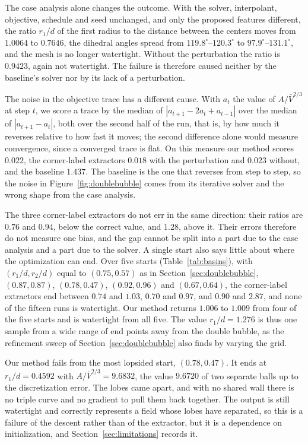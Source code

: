 \documentclass[11pt]{article}
\theoremstyle{definition}
\begin{document}
The case analysis alone changes the outcome. With the solver, interpolant,
objective, schedule and seed unchanged, and only the proposed features
different, the ratio $r_1/d$ of the first radius to the distance between the
centers moves from $1.0064$ to $0.7646$, the dihedral angles
spread from $119.8^\circ$--$120.3^\circ$ to $97.9^\circ$--$131.1^\circ$, and
the mesh is no longer watertight. Without the perturbation the ratio is
$0.9423$, again not watertight. The failure is therefore caused neither by
the baseline's solver nor by its lack of a perturbation.

The noise in the objective trace has a different cause. With $a_t$ the value
of $A/\bar V^{2/3}$ at step $t$, we score a trace by the median of
$|a_{t+1} - 2a_t + a_{t-1}|$ over the median of $|a_{t+1} - a_t|$, both over
the second half of the run, that is, by how much it reverses relative to how
fast it moves; the second difference alone would measure convergence, since
a converged trace is flat. On this measure our method scores
$0.022$, the corner-label extractors $0.018$ with the perturbation and
$0.023$ without, and the baseline $1.437$. The baseline is the one that
reverses from step to step, so the noise in Figure~\ref{fig:doublebubble}
comes from its iterative solver and the wrong shape from the case analysis.

The three corner-label extractors do not err in the same direction: their
ratios are $0.76$ and $0.94$, below the correct value, and $1.28$, above it.
Their errors therefore do not measure one bias, and the gap cannot be split
into a part due to the case analysis and a part due to the solver. A single
start also says little about where the optimization can end. Over five
starts (Table~\ref{tab:basins}), with $(r_1/d, r_2/d)$ equal to
$(0.75, 0.57)$ as in Section~\ref{sec:doublebubble}, $(0.87, 0.87)$,
$(0.78, 0.47)$, $(0.92, 0.96)$ and $(0.67, 0.64)$, the corner-label extractors end between
$0.74$ and $1.03$, $0.70$ and $0.97$, and $0.90$ and $2.87$, and none of the
fifteen runs is watertight. Our method returns $1.006$ to $1.009$ from four
of the five starts and is watertight from all five. The value
$r_1/d = 1.276$ is thus one sample from a wide range of end points away from
the double bubble, as the refinement sweep of
Section~\ref{sec:doublebubble} also finds by varying the grid.

Our method fails from the most lopsided start, $(0.78, 0.47)$. It ends at
$r_1/d = 0.4592$ with $A/\bar V^{2/3} = 9.6832$, the value $9.6720$ of two
separate balls up to the discretization error. The lobes came apart, and
with no shared wall there is no triple curve and no gradient to pull them
back together. The output is still watertight and correctly represents a
field whose lobes have separated, so this is a failure of the descent rather
than of the extractor, but it is a dependence on initialization, and
Section~\ref{sec:limitations} records it.
\end{document}
